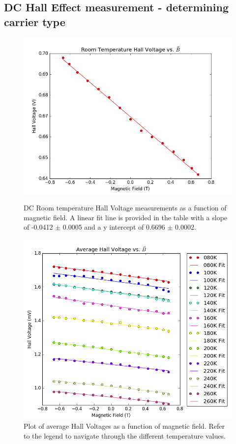 \documentclass[twocolumn]{article}
\begin{document}
\subsection{DC Hall Effect measurement - determining carrier type}
\begin{figure}
\begin{minipage}[t]{0.46\textwidth}
\includegraphics[width=\linewidth]{room-temperature-dc.png}
\caption{DC Room temperature Hall Voltage measurements as a function of 
magnetic field. A linear fit line is provided in the table with a slope of 
-0.0412 $\pm$ 0.0005 and a y intercept of 0.6696 $\pm$ 0.0002.}
\label{fig:9}
\end{minipage}
\hfill
\begin{minipage}[t]{0.46\textwidth}
\includegraphics[width=\linewidth]{average-hall-volt.png}
\caption{Plot of average Hall Voltages as a function of magnetic field. Refer 
to the legend to navigate through the different temperature values.}
\label{fig:10}
\end{minipage}
\end{figure}
\end{document}
